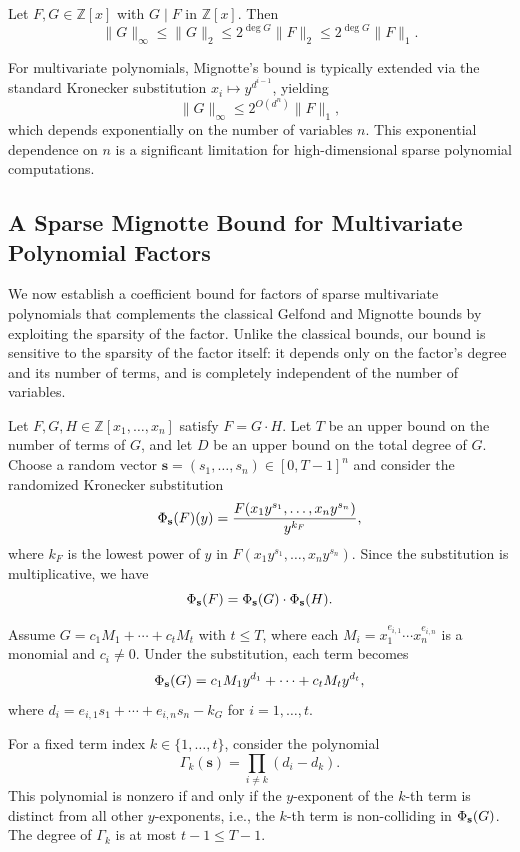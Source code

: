 \documentclass{article}
\numberwithin{equation}{section}
\begin{document}
\begin{lemma}\label{lem:mignotte-univariate}
Let $F, G \in \mathbb{Z}[x]$ with $G \mid F$ in $\mathbb{Z}[x]$. Then
\[
\|G\|_\infty \le \|G\|_2 \le 2^{\deg G} \|F\|_2 \le 2^{\deg G} \|F\|_1.
\]
\end{lemma}

For multivariate polynomials, Mignotte's bound is typically extended via the standard Kronecker substitution $x_i \mapsto y^{d^{i-1}}$, yielding
\[
\|G\|_\infty \le 2^{O(d^n)} \|F\|_1,
\]
which depends exponentially on the number of variables $n$. This exponential dependence on $n$ is a significant limitation for high-dimensional sparse polynomial computations.

\subsection*{A Sparse Mignotte Bound for Multivariate Polynomial Factors}

We now establish a coefficient bound for factors of sparse multivariate polynomials that complements the classical Gelfond and Mignotte bounds by exploiting the sparsity of the factor. Unlike the classical bounds, our bound is sensitive to the sparsity of the factor itself: it depends only on the factor's degree and its number of terms, and is completely independent of the number of variables. 

Let $F, G, H \in \mathbb{Z}[x_1, \dots, x_n]$ satisfy $F = G \cdot H$. Let $T$ be an upper bound on the number of terms of $G$, and let $D$ be an upper bound on the total degree of $G$. Choose a random vector $\mathbf{s} = (s_1, \dots, s_n) \in [0, T-1]^n$ and consider the randomized Kronecker substitution
\[
\Phi_{\mathbf{s}}(F)(y) = \frac{F(x_1y^{s_1}, \dots, x_ny^{s_n})}{y^{k_F}},
\]
where $k_F$ is the lowest power of $y$ in $F(x_1y^{s_1}, \dots, x_ny^{s_n})$. Since the substitution is multiplicative, we have
\[
\Phi_{\mathbf{s}}(F) = \Phi_{\mathbf{s}}(G) \cdot \Phi_{\mathbf{s}}(H).
\]

Assume $G = c_1 M_1 + \cdots + c_t M_t$ with $t \le T$, where each $M_i = x_1^{e_{i,1}} \cdots x_n^{e_{i,n}}$ is a monomial and $c_i \neq 0$. Under the substitution, each term becomes
\[
\Phi_{\mathbf{s}}(G) = c_1 M_1 y^{d_1} + \cdots + c_t M_t y^{d_t},
\]
where $d_i = e_{i,1} s_1 + \cdots + e_{i,n} s_n - k_G$ for $i = 1, \dots, t$.

For a fixed term index $k \in \{1,\dots,t\}$, consider the polynomial
\[
\Gamma_k(\mathbf{s}) = \prod_{i \neq k} (d_i - d_k).
\]
This polynomial is nonzero if and only if the $y$-exponent of the $k$-th term is distinct from all other $y$-exponents, i.e., the $k$-th term is non-colliding in $\Phi_{\mathbf{s}}(G)$. The degree of $\Gamma_k$ is at most $t-1 \le T-1$. 
\end{document}
